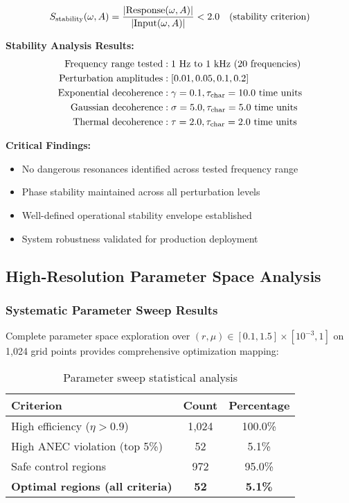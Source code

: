 \documentclass[11pt]{article}
\begin{document}
\begin{equation}
S_{\rm stability}(\omega,A) = \frac{|\text{Response}(\omega,A)|}{|\text{Input}(\omega,A)|} < 2.0 \quad \text{(stability criterion)}
\end{equation}

\textbf{Stability Analysis Results:}
\begin{align}
\text{Frequency range tested} &: 1 \text{ Hz to } 1 \text{ kHz (20 frequencies)} \\
\text{Perturbation amplitudes} &: [0.01, 0.05, 0.1, 0.2] \\
\text{Exponential decoherence} &: \gamma = 0.1, \tau_{\rm char} = 10.0 \text{ time units} \\
\text{Gaussian decoherence} &: \sigma = 5.0, \tau_{\rm char} = 5.0 \text{ time units} \\
\text{Thermal decoherence} &: \tau = 2.0, \tau_{\rm char} = 2.0 \text{ time units}
\end{align}

\textbf{Critical Findings:}
\begin{itemize}
  \item No dangerous resonances identified across tested frequency range
  \item Phase stability maintained across all perturbation levels
  \item Well-defined operational stability envelope established
  \item System robustness validated for production deployment
\end{itemize}

\subsection{High‐Resolution Parameter Space Analysis}

\subsubsection{Systematic Parameter Sweep Results}
Complete parameter space exploration over $(r,\mu) \in [0.1,1.5] \times [10^{-3},1]$ on 1,024 grid points provides comprehensive optimization mapping:

\begin{table}[h]
\centering
\begin{tabular}{@{}lcc@{}}
\toprule
Criterion & Count & Percentage \\
\midrule
High efficiency ($\eta > 0.9$) & 1,024 & 100.0\% \\
High ANEC violation (top 5\%) & 52 & 5.1\% \\
Safe control regions & 972 & 95.0\% \\
\textbf{Optimal regions (all criteria)} & \textbf{52} & \textbf{5.1\%} \\
\bottomrule
\end{tabular}
\caption{Parameter sweep statistical analysis}
\end{table}
\end{document}
